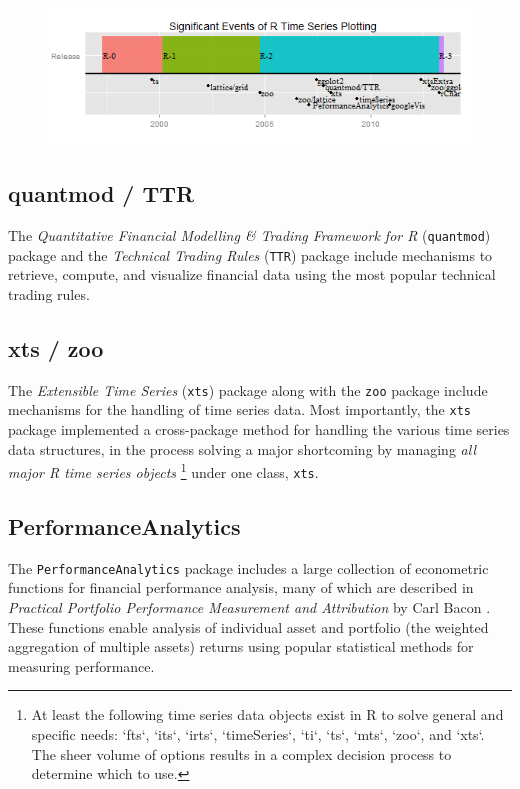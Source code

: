 \begin{figure}[htbp]
  \centering
  \includegraphics[width=14cm]{img/timeline}
\end{figure}

\subsection{quantmod / TTR}\label{quantmod-ttr}

The \emph{Quantitative Financial Modelling \& Trading Framework for R}
(\texttt{quantmod}) package and the \emph{Technical Trading Rules}
(\texttt{TTR}) package include mechanisms to retrieve, compute, and
visualize financial data using the most popular technical trading rules.

\subsection{xts / zoo}\label{xts-zoo}

The \emph{Extensible Time Series} (\texttt{xts}) package along with the
\texttt{zoo} package include mechanisms for the handling of time series
data. Most importantly, the \texttt{xts} package implemented a
cross-package method for handling the various time series data
structures, in the process solving a major shortcoming by managing
\emph{all major R time series objects}
\footnote{At least the following time series data objects exist in R to solve general and specific needs: `fts`, `its`, `irts`, `timeSeries`, `ti`, `ts`, `mts`, `zoo`, and `xts`. The sheer volume of options results in a complex decision process to determine which to use.}
under one class, \texttt{xts}.

\subsection{PerformanceAnalytics}\label{performanceanalytics}

The \texttt{PerformanceAnalytics} package includes a large collection of
econometric functions for financial performance analysis, many of which
are described in \emph{Practical Portfolio Performance Measurement and
Attribution} by Carl Bacon \citep{Bacon2004} . These functions enable
analysis of individual asset and portfolio (the weighted aggregation of
multiple assets) returns using popular statistical methods for measuring
performance.

